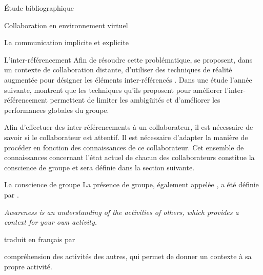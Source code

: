 \documentclass[myfrancais,ngerman,english,frenchb]{mythesis}
\begin{document}
\begin{mychapter}{Étude bibliographique}
\begin{mysection}{Collaboration en environnement virtuel}
\begin{mysubsection}{La communication implicite et explicite}
\begin{mysubsubsection}{L'inter-référencement}
					Afin de résoudre cette problématique,  se proposent, dans un contexte de collaboration distante, d'utiliser des techniques de réalité augmentée pour désigner les éléments inter-référencés .
					Dans une étude l'année suivante,  montrent que les techniques qu'ils proposent pour améliorer l'inter-référencement permettent de limiter les ambigüités et d'améliorer les performances globales du groupe.

					\begin{myfigure}
					\end{myfigure}

					Afin d'effectuer des inter-référencements à un collaborateur, il est nécessaire de savoir si le collaborateur est attentif.
					Il est nécessaire d'adapter la manière de procéder en fonction des connaissances de ce collaborateur.
					Cet ensemble de connaissances concernant l'état actuel de chacun des collaborateurs constitue la conscience de groupe et sera définie dans la section suivante.
				\end{mysubsubsection}
				\begin{mysubsubsection}{La conscience de groupe}
					La présence de groupe, également appelée , a été définie par .
					\begin{myquote}[english]
						\it Awareness is an understanding of the activities of others, which provides a context for your own activity.
					\end{myquote}
					traduit en français par 
					\begin{myquote} compréhension des activités des autres, qui permet de donner un contexte à sa propre activité.
					\end{myquote}


\end{mysubsubsection}
\end{mysubsection}
\end{mysection}
\end{mychapter}
\end{document}
